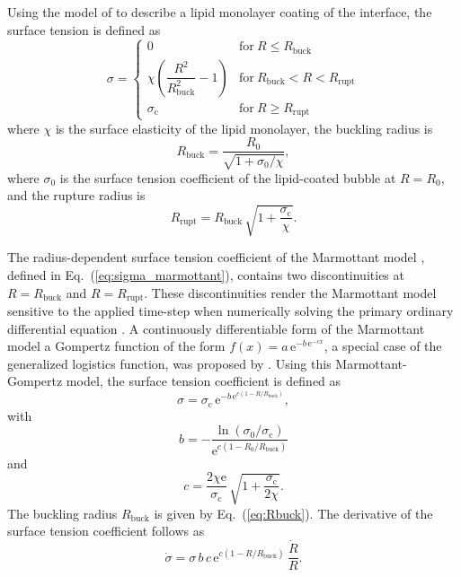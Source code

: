 Using the model of \citet{Marmottant2005} to describe a lipid monolayer coating of the interface, the surface tension is defined as
\begin{equation}
\sigma =
\begin{cases}
0 & \text{for} \ R \leq R_\text{buck} \\
\chi \left(\dfrac{R^2}{R_\text{buck}^2} - 1 \right) & \text{for} \ R_\text{buck} < R < R_\text{rupt} \\
\sigma_\text{c} & \text{for} \ R \geq R_\text{rupt}
\end{cases} \label{eq:sigma_marmottant}
\end{equation}
where $\chi$ is the surface elasticity of the lipid monolayer, the buckling radius is \citep{Overvelde2010}
\begin{equation}
R_\text{buck} = \frac{R_0}{\sqrt{1 + \sigma_0/\chi}}, 
\label{eq:Rbuck}
\end{equation}
where $\sigma_0$ is the surface tension coefficient of the lipid-coated bubble at $R=R_0$, and the rupture radius is
\begin{equation}
R_\text{rupt} = R_\text{buck} \, \sqrt{1+\frac{\sigma_\text{c}}{\chi}}.
\label{eq:Rrupt}
\end{equation} 

The radius-dependent surface tension coefficient of the Marmottant model \citep{Marmottant2005}, defined in Eq.~(\ref{eq:sigma_marmottant}), contains two discontinuities at $R=R_\text{buck}$ and $R=R_\text{rupt}$. These discontinuities render the Marmottant model sensitive to the applied time-step when numerically solving the primary ordinary differential equation \citep{Versluis2020}. A continuously differentiable form of the Marmottant model a Gompertz function of the form $f(x) = a \, \text{e}^{-b \, \text{e}^{-c x}}$, a special case of the generalized logistics function, was proposed by \citet{Guemmer2021}. Using this Marmottant-Gompertz model, the surface tension coefficient is defined as
\begin{equation}
\sigma = \sigma_\text{c} \, \text{e}^{-b \, \text{e}^{c (1-R/R_\text{buck})}}, \label{eq:sigma_gompertz}
\end{equation}
with
\begin{equation}
    b = - \frac{\ln (\sigma_0/\sigma_\text{c})}{\text{e}^{c(1-R_0/R_\text{buck})}}
\end{equation}
and
\begin{equation}
    c = \frac{2  \chi  \text{e}}{\sigma_\text{c}} \, \sqrt{1+\frac{\sigma_\text{c}}{2 \chi}}.
\end{equation}
The buckling radius $R_\text{buck}$ is given by Eq.~(\ref{eq:Rbuck}). 
The derivative of the surface tension coefficient follows as
\begin{equation}
\dot{\sigma} = \sigma \, b \, c \, \text{e}^{c (1-R/R_\text{buck})} \, \frac{\dot{R}}{R}.
\end{equation}

